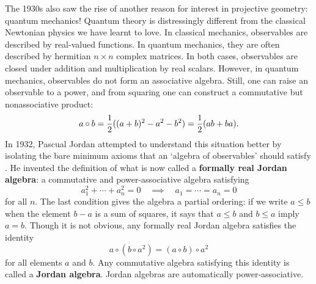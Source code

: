 \documentclass[12pt]{article}
\begin{document}
The 1930s also saw the rise of another reason for interest in projective 
geometry: quantum mechanics!  Quantum theory is distressingly different 
from the classical Newtonian physics we have learnt to love.  In 
classical mechanics, observables are described by real-valued functions. 
In quantum mechanics, they are often described by hermitian $n \times 
n$ complex matrices.   In both cases, observables are closed under 
addition and multiplication by real scalars.  However, in quantum 
mechanics, observables do not form an associative algebra.   Still,  
one can raise an observable to a power, and from squaring one 
can construct a commutative but nonassociative product: 
\[     a \circ b = {1\over 2}((a+b)^2 - a^2 - b^2) 
                  = {1\over 2}(ab + ba) . \] 
In 1932, Pascual Jordan attempted to understand this situation better by 
isolating  the bare minimum axioms that an `algebra of observables' 
should satisfy \cite{Jordan}.  He invented the definition of what is now 
called a {\bf formally real Jordan algebra}: a commutative and 
power-associative algebra satisfying 
\[  a_1^2 + \cdots + a_n^2 = 0 \quad \implies \quad a_1 = \cdots = a_n = 0  \] 
for all $n$.   The last condition gives the algebra a partial 
ordering: if we write $a \le b$ when the element $b - a$ is a sum of 
squares, it says that $a \le b$ and $b \le a$ imply $a = b$.  Though it 
is not obvious, any formally real Jordan algebra satisfies the identity  
\[         a \circ (b \circ a^2) = (a \circ b) \circ a^2 \] 
for all elements $a$ and $b$.   Any commutative algebra satisfying 
this identity is called a {\bf Jordan algebra}.  Jordan algebras are 
automatically power-associative.   
 
\end{document}
